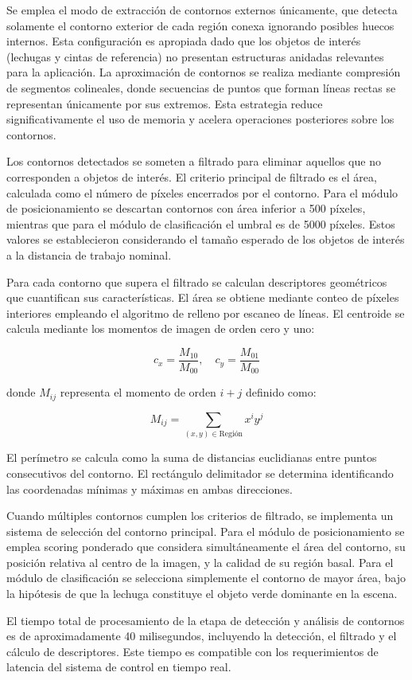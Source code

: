 Se emplea el modo de extracción de contornos externos únicamente, que detecta solamente el contorno exterior de cada región conexa ignorando posibles huecos internos. Esta configuración es apropiada dado que los objetos de interés (lechugas y cintas de referencia) no presentan estructuras anidadas relevantes para la aplicación. La aproximación de contornos se realiza mediante compresión de segmentos colineales, donde secuencias de puntos que forman líneas rectas se representan únicamente por sus extremos. Esta estrategia reduce significativamente el uso de memoria y acelera operaciones posteriores sobre los contornos.

Los contornos detectados se someten a filtrado para eliminar aquellos que no corresponden a objetos de interés. El criterio principal de filtrado es el área, calculada como el número de píxeles encerrados por el contorno. Para el módulo de posicionamiento se descartan contornos con área inferior a 500 píxeles, mientras que para el módulo de clasificación el umbral es de 5000 píxeles. Estos valores se establecieron considerando el tamaño esperado de los objetos de interés a la distancia de trabajo nominal.

Para cada contorno que supera el filtrado se calculan descriptores geométricos que cuantifican sus características. El área se obtiene mediante conteo de píxeles interiores empleando el algoritmo de relleno por escaneo de líneas. El centroide se calcula mediante los momentos de imagen de orden cero y uno:

\begin{equation}
c_x = \frac{M_{10}}{M_{00}}, \quad c_y = \frac{M_{01}}{M_{00}}
\end{equation}

donde $M_{ij}$ representa el momento de orden $i+j$ definido como:

\begin{equation}
M_{ij} = \sum_{(x,y) \in \text{Región}} x^i y^j
\end{equation}

El perímetro se calcula como la suma de distancias euclidianas entre puntos consecutivos del contorno. El rectángulo delimitador se determina identificando las coordenadas mínimas y máximas en ambas direcciones.

Cuando múltiples contornos cumplen los criterios de filtrado, se implementa un sistema de selección del contorno principal. Para el módulo de posicionamiento se emplea scoring ponderado que considera simultáneamente el área del contorno, su posición relativa al centro de la imagen, y la calidad de su región basal. Para el módulo de clasificación se selecciona simplemente el contorno de mayor área, bajo la hipótesis de que la lechuga constituye el objeto verde dominante en la escena.

El tiempo total de procesamiento de la etapa de detección y análisis de contornos es de aproximadamente 40 milisegundos, incluyendo la detección, el filtrado y el cálculo de descriptores. Este tiempo es compatible con los requerimientos de latencia del sistema de control en tiempo real.